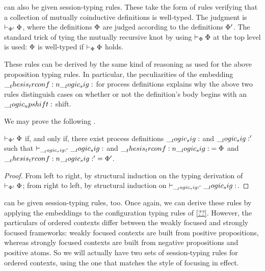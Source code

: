  can also be given session-typing rules.
These take the form of rules verifying that a collection of mutually coinductive definitions is well-typed.
The judgment is $\vdash_{\Phi'} \Phi$, where the definitions $\Phi$ are judged according to the definitions $\Phi'$.
The standard trick of tying the mutually recursive knot by using $\vdash_{\Phi} \Phi$ at the top level is used: $\Phi$ is well-typed if $\vdash_{\Phi} \Phi$ holds.
These rules can be derived by the same kind of reasoning as used for the above proposition typing rules.
In particular, the peculiarities of the embedding $\__thesis_trconf:n {\__logic_sig:}$ for process definitions explains why the above two rules distinguish cases on whether or not the definition's body begins with an $\__logic_upshift:$ shift.

We may prove the following .
\begin{theorem}\label{thm:embed:type-sig}
  $\vdash_{\Phi'} \Phi$ if, and only if, there exist process definitions $\__logic_sig:$ and $\__logic_sig:'$ such that $\vdash_{\__logic_sig:'} \__logic_sig:$ and $\__thesis_trconf:n {\__logic_sig:} = \Phi$ and $\__thesis_trconf:n {\__logic_sig:'} = \Phi'$.
\end{theorem}
\begin{proof}
  From left to right, by structural induction on the typing derivation of $\vdash_{\Phi'} \Phi$;
  from right to left, by structural induction on  $\vdash_{\__logic_sig:'} \__logic_sig:$.
\end{proof}


 can be given session-typing rules, too.
Once again, we can derive these rules by applying the embeddings to the configuration typing rules of \cref{??}.
However, the particulars of ordered contexts differ between the weakly focused and strongly focused frameworks: weakly focused contexts are built from positive propositions, whereas strongly focused contexts are built from negative propositions and positive atoms.
So we will actually have two sets of session-typing rules for ordered contexts, using the one that matches the style of focusing in effect.

